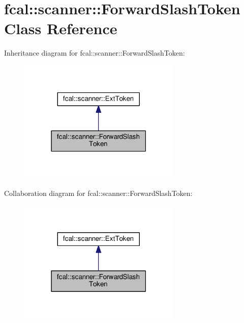 \hypertarget{classfcal_1_1scanner_1_1ForwardSlashToken}{}\section{fcal\+:\+:scanner\+:\+:Forward\+Slash\+Token Class Reference}
\label{classfcal_1_1scanner_1_1ForwardSlashToken}


Inheritance diagram for fcal\+:\+:scanner\+:\+:Forward\+Slash\+Token\+:\nopagebreak
\begin{figure}[H]
\begin{center}
\leavevmode
\includegraphics[width=219pt]{classfcal_1_1scanner_1_1ForwardSlashToken__inherit__graph}
\end{center}
\end{figure}


Collaboration diagram for fcal\+:\+:scanner\+:\+:Forward\+Slash\+Token\+:\nopagebreak
\begin{figure}[H]
\begin{center}
\leavevmode
\includegraphics[width=219pt]{classfcal_1_1scanner_1_1ForwardSlashToken__coll__graph}
\end{center}
\end{figure}
